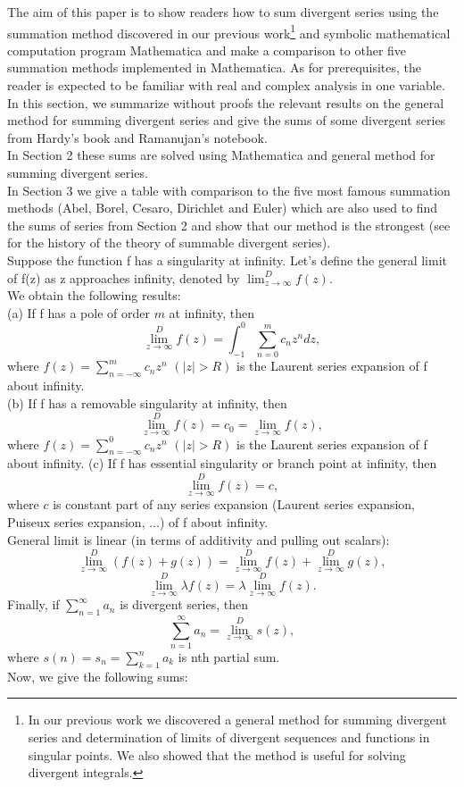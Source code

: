 \documentclass[12pt]{article}
\begin{document}
The aim of this paper is to show readers how to sum divergent series using the summation method discovered in our previous work\footnote{In our previous work we discovered a general method for summing divergent series and determination of limits of divergent sequences and functions in singular points. We also showed that the method is useful for solving divergent integrals.} and symbolic mathematical computation program Mathematica and make a comparison to other five summation methods implemented in Mathematica. As for prerequisites, the reader is expected to be familiar with real and complex analysis in one variable.\\
In this section, we summarize without proofs the relevant results on the general method for summing divergent series and give the sums of some divergent series from Hardy's book\cite{har} and Ramanujan's notebook\cite{ram}.\\
In Section 2 these sums are solved using Mathematica and general method for summing divergent series.\\
In Section 3 we give a table with comparison to the five most famous summation methods (Abel, Borel, Cesaro, Dirichlet and Euler) which are also used to find the sums of series from Section 2 and show that our method is the strongest (see \cite{tuc} for the history of the theory of summable divergent series).\\
Suppose the function f has a singularity at infinity. Let's define the general limit of f(z) as z approaches infinity, denoted by $\lim_{z\to\infty}^{D}f(z)$. \\
We obtain the following results:\\
(a) If f has a pole of order $m$ at infinity, then $$\lim_{z\to\infty}^{D}f(z)=\int_{-1}^0 \sum_{n=0}^{m} c_n z^n dz,$$ where $f(z)=\sum_{n=-\infty}^{m}c_n z^n $ $(|z|>R)$ is the Laurent series expansion
of f about infinity.\\
(b) If f has a removable singularity at infinity, then $$\lim_{z\to\infty}^{D}f(z)=c_0=\lim_{z\to\infty}f(z),$$ where $f(z)=\sum_{n=-\infty}^{0}c_n z^n $ $(|z|>R)$ is the Laurent series expansion
of f about infinity.
(c) If f has essential singularity or branch point at infinity, then $$\lim_{z\to\infty}^{D}f(z)=c,$$ where $c$ is constant part of any series expansion (Laurent series expansion, Puiseux series expansion, ...) of f about infinity.\\
General limit is linear (in terms of additivity and pulling out scalars):$$\lim_{z\to\infty}^{D}(f(z)+g(z))=\lim_{z\to\infty}^{D}f(z)+\lim_{z\to\infty}^{D}g(z),$$ $$\lim_{z\to\infty}^{D}\lambda f(z)=\lambda \lim_{z\to\infty}^{D}f(z).$$
Finally, if $\sum_{n=1}^{\infty} a_n$ is divergent series, then $$\sum_{n=1}^{\infty} a_n=\lim_{z\to\infty}^D s(z),$$ where $s(n)=s_n=\sum_{k=1}^n a_k$ is nth partial sum.
\\
Now, we give the following sums:
\end{document}
